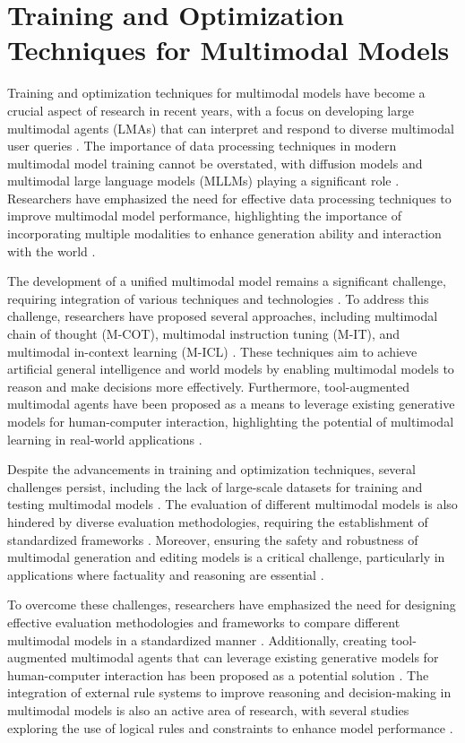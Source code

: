 \documentclass[conference]{IEEEtran}
\begin{document}
\section{Training and Optimization Techniques for Multimodal Models}
Training and optimization techniques for multimodal models have become a crucial aspect of research in recent years, with a focus on developing large multimodal agents (LMAs) that can interpret and respond to diverse multimodal user queries \cite{b1}. The importance of data processing techniques in modern multimodal model training cannot be overstated, with diffusion models and multimodal large language models (MLLMs) playing a significant role \cite{b2}. Researchers have emphasized the need for effective data processing techniques to improve multimodal model performance, highlighting the importance of incorporating multiple modalities to enhance generation ability and interaction with the world \cite{b3}.

The development of a unified multimodal model remains a significant challenge, requiring integration of various techniques and technologies \cite{b4}. To address this challenge, researchers have proposed several approaches, including multimodal chain of thought (M-COT), multimodal instruction tuning (M-IT), and multimodal in-context learning (M-ICL) \cite{b5}. These techniques aim to achieve artificial general intelligence and world models by enabling multimodal models to reason and make decisions more effectively. Furthermore, tool-augmented multimodal agents have been proposed as a means to leverage existing generative models for human-computer interaction, highlighting the potential of multimodal learning in real-world applications \cite{b6}.

Despite the advancements in training and optimization techniques, several challenges persist, including the lack of large-scale datasets for training and testing multimodal models \cite{b7}. The evaluation of different multimodal models is also hindered by diverse evaluation methodologies, requiring the establishment of standardized frameworks \cite{b8}. Moreover, ensuring the safety and robustness of multimodal generation and editing models is a critical challenge, particularly in applications where factuality and reasoning are essential \cite{b9}.

To overcome these challenges, researchers have emphasized the need for designing effective evaluation methodologies and frameworks to compare different multimodal models in a standardized manner \cite{b10}. Additionally, creating tool-augmented multimodal agents that can leverage existing generative models for human-computer interaction has been proposed as a potential solution \cite{b11}. The integration of external rule systems to improve reasoning and decision-making in multimodal models is also an active area of research, with several studies exploring the use of logical rules and constraints to enhance model performance \cite{b12}.
\end{document}
